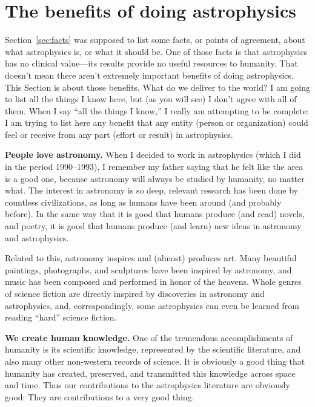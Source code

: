 \documentclass{article}
\newcommand{\sectionname}{Section}
\newcommand{\secref}[1]{\sectionname~\ref{#1}}
\newcommand{\paragraphskip}{\medskip}
\renewcommand{\paragraph}[1]{\par\paragraphskip\noindent\textbf{#1}}
\begin{document}
\section{The benefits of doing astrophysics}\label{sec:benefits}
\secref{sec:facts} was supposed to list some facts, or points of agreement, about what astrophysics is,
or what it should be.
One of those facts is that astrophysics has no clinical value---its results provide no useful resources to humanity.
That doesn't mean there aren't extremely important benefits of doing astrophysics.
This \sectionname{} is about those benefits.
What do we deliver to the world?
I am going to list all the things I know here, but (as you will see) I don't agree with all of them.
When I say ``all the things I know,'' I really am attempting to be complete:
I am trying to list here any benefit that any entity (person or organization) could feel or receive from any part (effort or result) in astrophysics.

\paragraph{People love astronomy.}
When I decided to work in astrophysics (which I did in the period 1990--1993), I remember my father saying that he felt like the area is a good one, because astronomy will always be studied by humanity, no matter what.
The interest in astronomy is so deep, relevant research has been done by countless civilizations, as long as humans have been around (and probably before).
In the same way that it is good that humans produce (and read) novels, and poetry, it is good that humans produce (and learn) new ideas in astronomy and astrophysics.

Related to this, astronomy inspires and (almost) produces art.
Many beautiful paintings, photographs, and sculptures have been inspired by astronomy, and music has been composed and performed in honor of the heavens.
Whole genres of science fiction are directly inspired by discoveries in astronomy and astrophysics,
and, correspondingly, some astrophysics can even be learned from reading ``hard'' science fiction.

\paragraph{We create human knowledge.}
One of the tremendous accomplishments of humanity is its scientific knowledge, represented by the scientific literature, and also many other non-western records of science.
It is obviously a good thing that humanity has created, preserved, and transmitted this knowledge across space and time.
Thus our contributions to the astrophysics literature are obviously good:
They are contributions to a very good thing.
\end{document}
